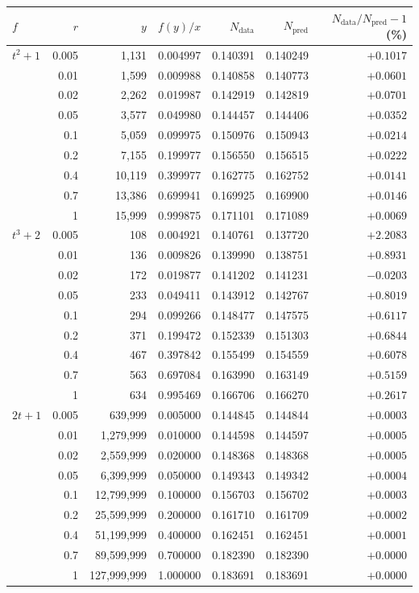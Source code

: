 \begin{tabular}{@{}lrrrrrr@{}}
\toprule
$f$ & $r$ & $y$ & $f(y)/x$ & $N_{\mathrm{data}}$ & $N_{\mathrm{pred}}$ & $N_{\mathrm{data}}/N_{\mathrm{pred}}-1$ (\%) \\
\midrule
$t^2+1$ & 0.005 & 1{,}131 & 0.004997 & 0.140391 & 0.140249 & $+0.1017$ \\
 & 0.01 & 1{,}599 & 0.009988 & 0.140858 & 0.140773 & $+0.0601$ \\
 & 0.02 & 2{,}262 & 0.019987 & 0.142919 & 0.142819 & $+0.0701$ \\
 & 0.05 & 3{,}577 & 0.049980 & 0.144457 & 0.144406 & $+0.0352$ \\
 & 0.1 & 5{,}059 & 0.099975 & 0.150976 & 0.150943 & $+0.0214$ \\
 & 0.2 & 7{,}155 & 0.199977 & 0.156550 & 0.156515 & $+0.0222$ \\
 & 0.4 & 10{,}119 & 0.399977 & 0.162775 & 0.162752 & $+0.0141$ \\
 & 0.7 & 13{,}386 & 0.699941 & 0.169925 & 0.169900 & $+0.0146$ \\
 & 1 & 15{,}999 & 0.999875 & 0.171101 & 0.171089 & $+0.0069$ \\
\midrule
$t^3+2$ & 0.005 & 108 & 0.004921 & 0.140761 & 0.137720 & $+2.2083$ \\
 & 0.01 & 136 & 0.009826 & 0.139990 & 0.138751 & $+0.8931$ \\
 & 0.02 & 172 & 0.019877 & 0.141202 & 0.141231 & $-0.0203$ \\
 & 0.05 & 233 & 0.049411 & 0.143912 & 0.142767 & $+0.8019$ \\
 & 0.1 & 294 & 0.099266 & 0.148477 & 0.147575 & $+0.6117$ \\
 & 0.2 & 371 & 0.199472 & 0.152339 & 0.151303 & $+0.6844$ \\
 & 0.4 & 467 & 0.397842 & 0.155499 & 0.154559 & $+0.6078$ \\
 & 0.7 & 563 & 0.697084 & 0.163990 & 0.163149 & $+0.5159$ \\
 & 1 & 634 & 0.995469 & 0.166706 & 0.166270 & $+0.2617$ \\
\midrule
$2t+1$ & 0.005 & 639{,}999 & 0.005000 & 0.144845 & 0.144844 & $+0.0003$ \\
 & 0.01 & 1{,}279{,}999 & 0.010000 & 0.144598 & 0.144597 & $+0.0005$ \\
 & 0.02 & 2{,}559{,}999 & 0.020000 & 0.148368 & 0.148368 & $+0.0005$ \\
 & 0.05 & 6{,}399{,}999 & 0.050000 & 0.149343 & 0.149342 & $+0.0004$ \\
 & 0.1 & 12{,}799{,}999 & 0.100000 & 0.156703 & 0.156702 & $+0.0003$ \\
 & 0.2 & 25{,}599{,}999 & 0.200000 & 0.161710 & 0.161709 & $+0.0002$ \\
 & 0.4 & 51{,}199{,}999 & 0.400000 & 0.162451 & 0.162451 & $+0.0001$ \\
 & 0.7 & 89{,}599{,}999 & 0.700000 & 0.182390 & 0.182390 & $+0.0000$ \\
 & 1 & 127{,}999{,}999 & 1.000000 & 0.183691 & 0.183691 & $+0.0000$ \\
\bottomrule
\end{tabular}
